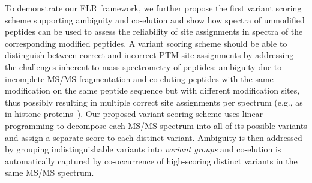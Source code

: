 \documentclass[11pt]{article}
\begin{document}
To demonstrate our FLR framework, we further propose the first variant scoring scheme supporting ambiguity and co-elution and show how spectra of unmodified peptides can be used to assess the reliability of site assignments in spectra of the corresponding modified peptides.
A variant scoring scheme should be able to distinguish between correct and incorrect PTM site assignments by addressing the challenges inherent to mass spectrometry of peptides: ambiguity due to incomplete MS/MS fragmentation and co-eluting peptides with the same modification on the same peptide sequence but with different modification sites, thus possibly resulting in multiple correct site assignments per spectrum (e.g., as in histone proteins~\cite{DiMaggio2009}). 
%
Our proposed variant scoring scheme uses linear programming to decompose each MS/MS spectrum into all of its possible variants and assign a separate score to each distinct variant. Ambiguity is then addressed by grouping indistinguishable variants into {\em variant groups} and co-elution is automatically captured by co-occurrence of high-scoring distinct variants in the same MS/MS spectrum.
%
\end{document}
